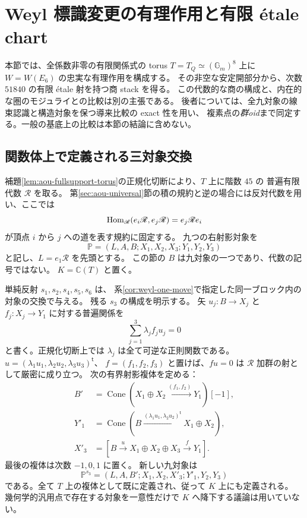 \section{Weyl 標識変更の有理作用と有限 \'etale chart}
\label{sec:weyl-moduli-chart}

本節では、全係数非零の有限関係式の torus
$T=T_Q\simeq(\mathbb G_m)^8$ 上に $W=W(E_6)$ の忠実な有理作用を構成する。
その非空な安定開部分から、次数 $51840$ の有限 \'etale 射を持つ商 stack を得る。
この代数的な商の構成と、内在的な圏のモジュライとの比較は別の主張である。
後者については、全九対象の線束認識と構造対象を保つ導来比較の exact 性を用い、
複素点の\emph{群oid}まで同定する。一般の基底上の比較は本節の結論に含めない。

\subsection{関数体上で定義される三対象交換}

補題\ref{lem:aou-fullsupport-torus}の正規化切断により、$T$ 上に階数 $45$ の
普遍有限代数 $\mathscr R$ を取る。
第\ref{sec:aou-universal}節の積の規約と逆の場合には反対代数を用い、ここでは
\[
 \operatorname{Hom}_{\mathscr R}(e_i\mathscr R,e_j\mathscr R)
 =e_j\mathscr R e_i
\]
が頂点 $i$ から $j$ への道を表す規約に固定する。
九つの右射影対象を
\[
 \mathbb P=(L,A,B;X_1,X_2,X_3;Y_1,Y_2,Y_3)
\]
と記し、$L=e_1\mathscr R$ を先頭とする。
この節の $B$ は九対象の一つであり、代数の記号ではない。
$K=\mathbb C(T)$ と置く。

単純反射 $s_1,s_2,s_4,s_5,s_6$ は、
系\ref{cor:weyl-one-move}で指定した同一ブロック内の対象の交換で与える。
残る $s_3$ の構成を明示する。
矢 $u_j:B\to X_j$ と $f_j:X_j\to Y_1$ に対する普遍関係を
\[
 \sum_{j=1}^3\lambda_j f_ju_j=0
\]
と書く。正規化切断上では $\lambda_j$ は全て可逆な正則関数である。
$u=(\lambda_1u_1,\lambda_2u_2,\lambda_3u_3)^{\mathsf t}$、
$f=(f_1,f_2,f_3)$ と置けば、$fu=0$ は $\mathscr R$ 加群の射として厳密に成り立つ。
次の有界射影複体を定める：
\begin{equation}\label{eq:universal-cross-complexes}
 \begin{aligned}
 B'&=\operatorname{Cone}(X_1\oplus X_2\xrightarrow{(f_1,f_2)}Y_1)[-1],\\
 Y'_1&=\operatorname{Cone}
       (B\xrightarrow{(\lambda_1u_1,\lambda_2u_2)^{\mathsf t}}X_1\oplus X_2),\\
 X'_3&=[B\xrightarrow{u}X_1\oplus X_2\oplus X_3\xrightarrow{f}Y_1].
 \end{aligned}
\end{equation}
最後の複体は次数 $-1,0,1$ に置く。
新しい九対象は
\[
 \mathbb P^{s_3}=(L,A,B';X_1,X_2,X'_3;Y'_1,Y_2,Y_3)
\]
である。全て $T$ 上の複体として既に定義され、従って $K$ 上にも定義される。
幾何学的汎用点で存在する対象を一意性だけで $K$ へ降下する議論は用いていない。

